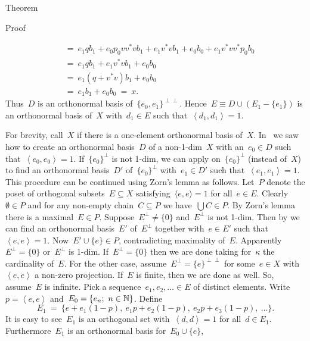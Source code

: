 \begin{parsec}
\begin{point}{Theorem}
\begin{point}{Proof}
\begin{point}
\begin{align*}
    &\ = \ e_1 q b_1 + e_0 p_0 vv^* vb_1 + e_1v^*vb_1 + e_0 b_0 + e_1v^* vv^* p_0 b_0 \\
    &\ = \ e_1 q b_1 + e_1v^*vb_1 + e_0 b_0  \\
    &\ = \ e_1 (q + v^*v) b_1 + e_0 b_0  \\
    &\ = \ e_1 b_1 + e_0 b_0 \ = \ x.
\end{align*}
Thus~$D$ is an orthonormal basis of~$\{e_0, e_1\}^{\perp\perp}$.
Hence~$E \equiv D \cup (E_1 - \{e_1\})$ is an orthonormal basis of~$X$
with~$d_1 \in E$ such that~$\left<d_1,d_1\right>=1$.
\end{point}
\begin{point}%
For brevity, call~$X$  if there is a one-element orthonormal basis of~$X$.
In~ we saw
    how to create an orthonormal basis~$D$ of a non-1-dim~$X$
    with an~$e_0 \in D$ such that~$\left<e_0,e_0\right>=1$.
If~$\{e_0\}^\perp$ is not 1-dim,
    we can apply 
    on~$\{e_0\}^\perp$ (instead of~$X$)
    to find an orthonormal basis~$D'$ of~$\{e_0\}^\perp$
    with~$e_1 \in D'$ such that~$\left<e_1,e_1\right>=1$.
This procedure can be continued using Zorn's lemma as follows.
Let~$P$ denote the poset of orthogonal subsets~$E \subseteq X$
    satisfying~$\langle e,e\rangle = 1$ for all~$e\in E$.
Clearly~$\emptyset\in P$
and for any non-empty chain~$C \subseteq P$
    we have~$\bigcup C \in P$.
By Zorn's lemma there is a maximal~$E \in P$.
Suppose~$E^\perp \neq \{0\}$ and~$E^\perp$ is not 1-dim.
Then by 
    we can find an orthonormal basis~$E'$ of~$E^\perp$
    together with~$e \in E'$ such that~$\left<e,e\right>=1$.
Now~$E' \cup \{e\} \in P$, contradicting maximality of~$E$.
Apparently~$E^\perp = \{0\}$ or~$E^\perp$ is 1-dim.
If~$E^\perp = \{0\}$
    then we are done
    taking for~$\kappa$ the cardinality of~$E$.
For the other case, assume~$E^\perp = \{e\}^{\perp\perp}$
    for some~$e \in X$ with~$\left<e,e\right>$ a non-zero projection.
If~$E$ is finite, then we are done as well.
So, assume~$E$ is infinite.
Pick a sequence~$e_1, e_2, \ldots \in E$ of distinct elements.
Write~$p = \left<e,e\right>$
    and~$E_0 = \{e_n;\ n\in \mathbb{N}\}$.
Define
\begin{equation*}
    E_1 \ =\  \{e + e_1(1-p), \ e_1p + e_2(1-p),\  e_2p  +e_3(1-p),\  \ldots \}.
\end{equation*}
It is easy to see~$E_1$ is an orthogonal set
    with~$\left<d,d\right>=1$ for all~$d \in E_1$.
Furthermore~$E_1$ is an orthonormal basis for~$E_0 \cup \{e\}$,

\end{point}
\end{point}
\end{point}
\end{parsec}
